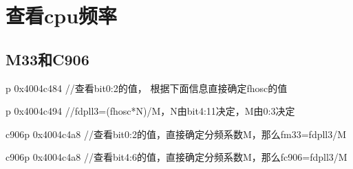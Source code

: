\documentclass[letterpaper,10pt,english]{sphinxmanual}
\begin{document}
\chapter{查看cpu频率}
\label{\detokenize{r128_u9a8c_u8bc1_u56fa_u4ef6/r128_u9a8c_u8bc1_u56fa_u4ef6_u5f00_u53d1_u6307_u5357:cpu}}

\section{M33和C906}
\label{\detokenize{r128_u9a8c_u8bc1_u56fa_u4ef6/r128_u9a8c_u8bc1_u56fa_u4ef6_u5f00_u53d1_u6307_u5357:m33c906}}
\sphinxAtStartPar
{}

\begin{sphinxVerbatim}[commandchars=\\\{\}]
p 0x4004c484 //查看bit0:2的值， 根据下面信息直接确定f\PYGZus{}hosc的值
\end{sphinxVerbatim}

\sphinxAtStartPar
{}

\sphinxAtStartPar
{}

\begin{sphinxVerbatim}[commandchars=\\\{\}]
p 0x4004c494 //f\PYGZus{}dpll3=(f\PYGZus{}hosc*N)/M，N由bit4:11决定，M由0:3决定
\end{sphinxVerbatim}

\sphinxAtStartPar
{}

\sphinxAtStartPar
{}

\sphinxAtStartPar
{}

\begin{sphinxVerbatim}[commandchars=\\\{\}]
c906\PYGZgt{}p 0x4004c4a8 //查看bit0:2的值，直接确定分频系数M，那么f\PYGZus{}m33=f\PYGZus{}dpll3/M
\end{sphinxVerbatim}

\sphinxAtStartPar
{}

\sphinxAtStartPar
{}

\begin{sphinxVerbatim}[commandchars=\\\{\}]
c906\PYGZgt{}p 0x4004c4a8 //查看bit4:6的值，直接确定分频系数M，那么f\PYGZus{}c906=f\PYGZus{}dpll3/M
\end{sphinxVerbatim}
\end{document}
